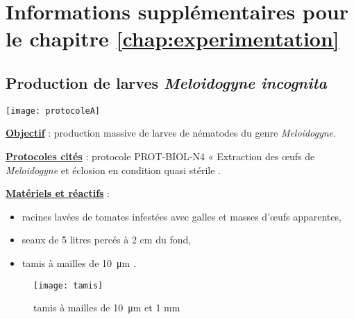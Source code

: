 

\chapter{Informations supplémentaires pour le chapitre \ref{chap:experimentation}}  \label{secanchap4}





	
\section{Production de larves  \textit{Meloidogyne  incognita}} \label{secan1}


\hspace{-8mm}
	  \texttt{[image: protocoleA]}
     
        
        
\noindent \textbf{ \underline{Objectif} }: production massive de larves de nématodes du genre \textit{Meloidogyne}.

\noindent \textbf{ \underline{Protocoles cités} }: protocole PROT-BIOL-N4 « Extraction des œufs de \textit{ Meloidogyne}  et éclosion en condition quasi
\og stérile \fg .

\noindent \textbf{ \underline{Matériels et réactifs} }:

\vspace{-5mm}
\begin{minipage}[c]{0.85 \linewidth}
		\begin{itemize}[leftmargin=0cm]
		\item racines lavées de tomates infestées avec galles et masses d'œufs apparentes,
		\item seaux de 5 litres percés à 2 cm du fond, 
		\item tamis à mailles de  \SI{10}{\micro\metre} .
		 \end{itemize}
\end{minipage}
 \hspace{3mm}
\begin{minipage}{0.5 \textwidth}
		\begin{figure}[H]          
		\texttt{[image: tamis]}  
			\begin{minipage}{0.5 \textwidth}
			\caption{ tamis à mailles de  \SI{10}{\micro\metre} et 1 mm}
			\label{tamis}
			\end{minipage} 
	    \end{figure}
\end{minipage} 
        
